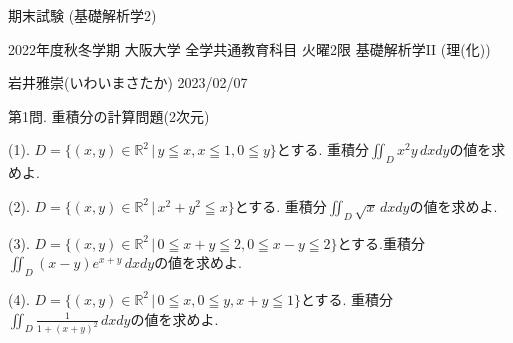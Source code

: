 \documentclass[dvipdfmx,a4paper,11pt]{article}
\newcommand{\R}{\mathbb{R}}
\theoremstyle{definition}
\begin{document}
\begin{center}
{\Large 期末試験 (基礎解析学2)}

{\small 2022年度秋冬学期 大阪大学 全学共通教育科目 火曜2限 基礎解析学II (理(化))}
\end{center}

\begin{flushright}
 岩井雅崇(いわいまさたか) 2023/02/07
\end{flushright}

\vspace{44pt}
{\Large 第1問.} 重積分の計算問題(2次元)
\vspace{11pt}



{\large(1). $D=\{ (x,y) \in \R^2  \,|\,  y \leqq x, x \leqq 1, 0 \leqq y  \}$とする. 重積分$\iint_{D} x^2y \, dxdy$の値を求めよ.}\vspace{7pt}

{\large(2). $D=\{ (x,y) \in \R^2 \,|\, x^2 + y^2 \leqq x\}$とする.
重積分$\iint_{D} \sqrt{x}\,dxdy$の値を求めよ.}\vspace{7pt}



{\large(3). $D=\{ (x,y) \in \R^2 \,|\, 0 \leqq x+y \leqq 2, 0 \leqq x-y \leqq 2\}$とする.重積分$\iint_{D} (x-y)e^{x+y}\,dxdy$の値を求めよ.}\vspace{7pt}

{\large(4). $D=\{ (x,y) \in \R^2 \,|\, 0 \leqq x, 0 \leqq y,  x+y \leqq 1\}$とする.
重積分$\iint_{D} \frac{1}{1 + (x+y)^2}\,dxdy$の値を求めよ.}\vspace{7pt}

\end{document}
